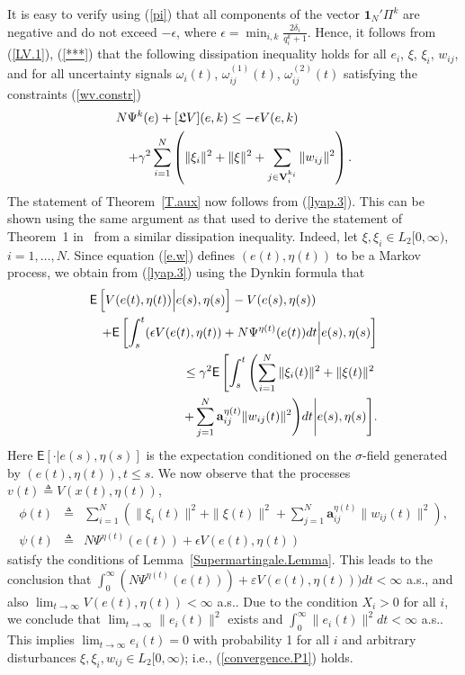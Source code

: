 \documentclass[a4paper,twocolumn]{autart}
\begin{document}
It is easy to verify using (\ref{pi}) that all components of the vector
$\mathbf{1}_N'\Pi^k$ are negative and do not exceed $-\epsilon$, where
$\epsilon=\min_{i,k}\frac{2\delta_i}{q_i^k+1}$.
Hence, it follows from (\ref{LV.1}), (\ref{***}) that the following
dissipation inequality holds for all $e_i$, $\xi$, $\xi_i$, 
$w_{ij}$, and 
 for all uncertainty signals $\omega_{i}(t)$,
$\omega_{ij}^{(1)}(t)$, 
$\omega_{ij}^{(2)}(t)$ satisfying the constraints (\ref{wv.constr})      
\begin{eqnarray}
\lefteqn{N\Psi^k(e)+[\mathfrak{L} V](e,k)\le  -\epsilon 
V(e,k) } && \nonumber \\
 && + \gamma^2\sum_{i=1}^N\left (\|\xi_i\|^2+ \|\xi\|^2+ \sum_{j\in
  \mathbf{V}_i^{k_i}} \|w_{ij}\|^2 \right).
\label{lyap.3}
\end{eqnarray}
The statement of Theorem~\ref{T.aux} now follows from (\ref{lyap.3}). This
can be shown 
using the same argument as that used to derive the statement of Theorem~1
in~\cite{U6} from a similar dissipation inequality. 
Indeed, let $\xi,{\xi_i}\in L_2[0,\infty)$, $i=1,\ldots,N$. 
Since equation (\ref{e.w}) defines $(e(t),\eta(t))$ to be a 
Markov process, we obtain from (\ref{lyap.3})  using the Dynkin
formula that 
\begin{eqnarray}
\lefteqn{\mathsf{E}\left[V(e(t),\eta(t))\Big|e(s),\eta(s)\right]-V(e(s),\eta(s))}
&& \nonumber \\
&&
+\mathsf{E}\left[\int_s^t(\epsilon V(e(t),\eta(t))+N\Psi^{\eta(t)}(e(t))dt\Big|e(s),\eta(s)\right]
\nonumber \\
&&\le \gamma^2\mathsf{E}\left[\int_s^t\left(\sum_{i=1}^N\|\xi_i(t)\|^2+
    \|\xi(t)\|^2 \right.\right. \nonumber \\
&&+ \sum_{j=1}^N \mathbf{a}_{ij}^{\eta(t)}\|w_{ij}(t)\|^2 \Bigg)dt\Bigg|e(s),\eta(s)\Bigg].
\label{lyap.5}
\end{eqnarray}
Here $\mathsf{E}\left[\cdot|e(s),\eta(s)\right]$ is the expectation
conditioned on the $\sigma$-field generated by $(e(t),\eta(t)), t\le s$.
We now observe that the processes $ v(t)\triangleq V(x(t),\eta(t))$, 
\begin{eqnarray*}
 \phi(t)&\triangleq& \sum_{i=1}^N\left(\|\xi_i(t)\|^2+
  \|\xi(t)\|^2+\sum_{j=1}^N \mathbf{a}_{ij}^{\eta(t)}\|w_{ij}(t)\|^2\right), \\
  \psi(t)&\triangleq& N\Psi^{\eta(t)}(e(t))+\epsilon V(e(t),\eta(t))
\end{eqnarray*}
satisfy the conditions of Lemma~\ref{Supermartingale.Lemma}. 
This leads to the
conclusion that 
$\int_0^\infty(N\Psi^{\eta(t)}(e(t)))+\varepsilon V(e(t),\eta(t)))dt <\infty$
a.s., and also $\lim_{t\to 
  \infty}V(e(t),\eta(t)) <\infty$ a.s.. Due to the condition $X_i>0$
for all $i$, we conclude that  $\lim_{t\to \infty}
\|e_i(t)\|^2$ exists and $\int_0^\infty\|e_i(t)\|^2dt <\infty$ a.s.. This
implies $\lim_{t\to \infty} e_i(t)=0$ with probability 1 for all $i$ and
arbitrary disturbances $\xi,\xi_i,w_{ij}\in L_2[0,\infty)$; i.e.,
(\ref{convergence.P1}) holds. 
\end{document}

